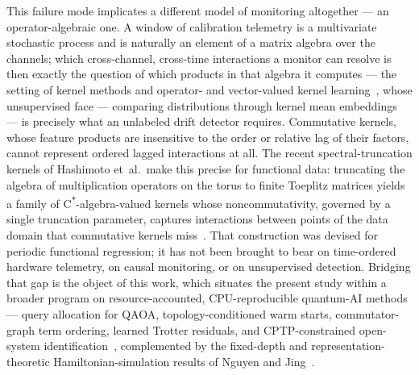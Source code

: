 \documentclass[
  aps,
  prresearch,
  reprint,
  amsmath,
  amssymb,
  nofootinbib,
  floatfix,
]{revtex4-2}
\begin{document}
This failure mode implicates a different model of monitoring altogether --- an
operator-algebraic one. A window of calibration telemetry is a multivariate
stochastic process and is naturally an element of a matrix algebra over the
channels; which cross-channel, cross-time interactions a monitor can resolve is
then exactly the question of which products in that algebra it computes --- the
setting of kernel methods and operator- and vector-valued kernel
learning~\citep{scholkopf2002kernels,micchelli2005vector}, whose unsupervised face
--- comparing distributions through kernel mean
embeddings~\citep{muandet2017kme} --- is precisely what an unlabeled drift detector
requires. Commutative kernels, whose feature products are insensitive to the order
or relative lag of their factors, cannot represent ordered lagged interactions at
all. The recent spectral-truncation kernels of
Hashimoto et~al.\ make this precise for functional data: truncating the algebra of
multiplication operators on the torus to finite Toeplitz matrices yields a family
of C\textsuperscript{$\ast$}-algebra-valued kernels whose noncommutativity,
governed by a single truncation parameter, captures interactions between points of
the data domain that commutative kernels miss~\citep{hashimoto2024spectral}. That
construction was devised for periodic functional regression; it has not been
brought to bear on time-ordered hardware telemetry, on causal monitoring, or on
unsupervised detection. Bridging that gap is the object of this work, which
situates the present study within a broader program on resource-accounted,
CPU-reproducible quantum-AI methods --- query allocation for QAOA,
topology-conditioned warm starts, commutator-graph term ordering, learned Trotter
residuals, and CPTP-constrained open-system
identification~\citep{huynh2026uqqaoa,huynh2026topoqaoa,huynh2026topoham,huynh2026liergtc,huynh2026cptppinn},
complemented by the fixed-depth and representation-theoretic Hamiltonian-simulation
results of Nguyen and Jing~\citep{nguyen2025zassenhaus,jing2026complexity}.
\end{document}
